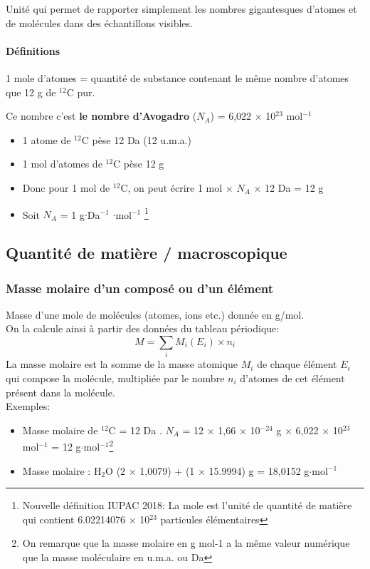 \documentclass[10pt,a4paper]{book}
\begin{document}
Unité qui permet de rapporter simplement les nombres gigantesques d’atomes et de molécules dans des échantillons visibles.
\paragraph{Définitions} 1 mole d’atomes = quantité de substance contenant le même nombre d’atomes que 12 g de $^{12}$C pur. \par
Ce nombre c'est \textbf{le nombre d'Avogadro} ($N_A$) = 6,022 $\times$ 10$^{23}$ mol$^{-1}$
\begin{itemize}
\item 1 atome de $^{12}$C pèse 12 Da (12 u.m.a.)
\item 1 mol d’atomes de $^{12}$C pèse 12 g
\item Donc pour 1 mol de $^{12}$C, on peut écrire 1 mol $\times$ $N_A$ $\times$ 12 Da = 12 g
\item Soit $N_A$ = 1 g$\cdot$Da$^{-1}$ $\cdot$mol$^{-1}$ \footnote{Nouvelle définition IUPAC 2018: La mole est l’unité de quantité de matière qui contient 6.02214076 $\times$ 10$^{23}$ particules élémentaires} \\
\end{itemize}

\subsection{Quantité de matière / macroscopique}

\subsubsection{Masse molaire d’un composé ou d’un élément}

Masse d’une mole de molécules (atomes, ions etc.) donnée en g/mol. \\
On la calcule ainsi à partir des données du tableau périodique:
\begin{displaymath}
M = {\sum_i}M_i(E_i){\times}n_i
\end{displaymath}
La masse molaire est la somme de la masse atomique $M_i$ de chaque élément $E_i$ qui compose la molécule, multipliée par le nombre $n_i$ d’atomes de cet élément présent dans la molécule. \\
Exemples:
\begin{itemize}
\item Masse molaire de $^{12}$C = 12 Da . $N_A$ = 12 $\times$ 1,66 $\times$ 10$^{-24}$ g $\times$ 6,022 $\times$ 10$^{23}$ mol$^{-1}$ = 12 g$\cdot$mol$^{-1}$\footnote{On remarque que la masse molaire en g mol-1 a la même valeur numérique que la masse moléculaire en u.m.a. ou Da}
\item Masse molaire : H$_2$O (2 $\times$ 1,0079) + (1 $\times$ 15.9994) g = 18,0152 g$\cdot$mol$^{-1}$
\end{itemize}
\end{document}
